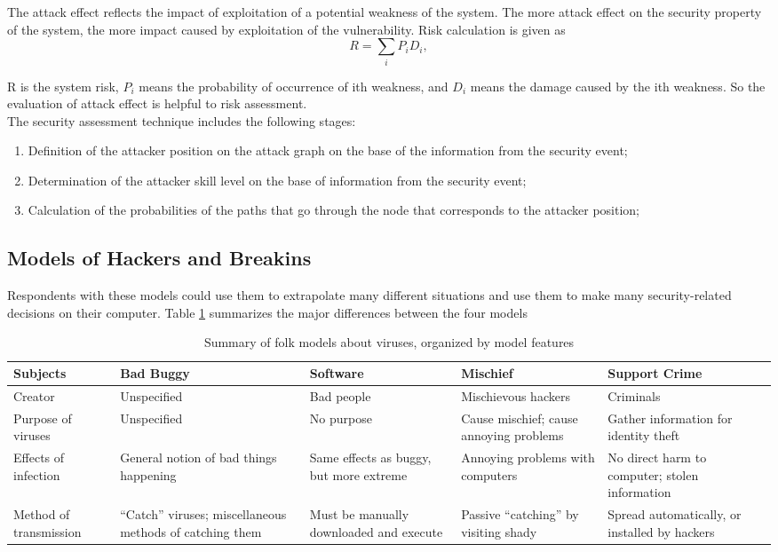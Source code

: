 \documentclass{ledger}
\begin{document}
The attack effect reflects the impact of exploitation of a potential weakness of the system. The more attack effect on the security property of the system, the more impact caused by exploitation of the vulnerability. Risk calculation is given as
\begin{equation}
\label{eq:3}
  R=\sum\limits_{i}  P_iD_i,
\end{equation}

R is the system risk, $P_i$ means the probability of occurrence of ith weakness, and $D_i$ means the damage caused by the ith weakness. So the evaluation of attack effect is helpful to risk assessment.\\

The security assessment technique includes the following stages: 
\begin{enumerate}
    \item Definition of the attacker position on the attack graph on the base of the information from the security event;
    \item Determination of the attacker skill level on the base of information from the security event;
    \item Calculation of the probabilities of the paths that go through the node that corresponds to the attacker position;
\end{enumerate}




\subsection{Models of Hackers and Breakins}
Respondents with these models could use them to extrapolate many different situations and use them to make many security-related decisions on their computer. Table \ref{table1:data} summarizes the major differences between the four models  \\

\begin{table}[H]
\centering
\begin{tabular}{p{2cm}|p{2cm}|p{2cm}|p{2cm}|p{2cm}}
     \hline
     Subjects & Bad Buggy & Software & Mischief & Support Crime \\
     \hline
     Creator & Unspecified & Bad  people  & Mischievous hackers  & Criminals \\
     \hline
     Purpose of viruses & Unspecified & No purpose & Cause mischief; cause annoying problems & Gather information for identity theft\\
     \hline
     Effects of infection  & General notion of bad things happening & Same effects as buggy, but more extreme & Annoying problems with computers & No direct harm to computer; stolen information\\ 
     \hline
     Method of transmission & “Catch” viruses; miscellaneous methods of catching them &
     Must be manually downloaded and execute &
     Passive “catching” by visiting shady  &
     Spread automatically, or installed by hackers \\
     \hline
\end{tabular}
\caption{Summary of folk models about viruses, organized by model features}
\label{table1:data}
\end{table}
\end{document}
